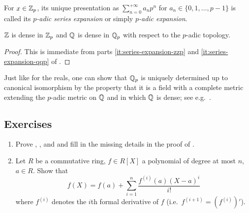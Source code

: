 \documentclass[12pt, leqno, british]{amsart}
\begin{document}
For $x \in \mathbb Z_p$, its unique presentation as $\sum_{n=0}^{+\infty} a_np^n$ for $a_n \in \lbrace 0, 1, \ldots, p-1 \rbrace$ is called its \emph{$p$-adic series expansion} or simply \emph{$p$-adic expansion}.
\begin{eg}
\end{eg}
\begin{cor}
$\mathbb Z$ is dense in $\mathbb Z_p$ and $\mathbb Q$ is dense in $\mathbb Q_p$ with respect to the $p$-adic topology.
\end{cor}
\begin{proof}
This is immediate from parts \eqref{it:series-expansion-zzp} and \eqref{it:series-expansion-qqp} of .
\end{proof}
Just like for the reals, one can show that $\mathbb Q_p$ is uniquely determined up to canonical isomorphism by the property that it is a field with a complete metric extending the $p$-adic metric on $\mathbb Q$ and in which $\mathbb Q$ is dense; see e.g.~\cite[Theorem 2.4.3]{Eng05}.

\subsection{Exercises}
\begin{enumerate}
\item Prove , , and  and fill in the missing details in the proof of .
\item\label{ex:formal-Taylor} Let $R$ be a commutative ring, $f \in R[X]$ a polynomial of degree at most $n$, $a \in R$.
Show that
\begin{displaymath}
f(X) = f(a) + \sum_{i=1}^n \frac{f^{(i)}(a)(X-a)^i}{i!}
\end{displaymath}
where $f^{(i)}$ denotes the $i$th formal derivative of $f$ (i.e.~$f^{(i+1)} = (f^{(i)})'$).
\end{enumerate}
\end{document}
